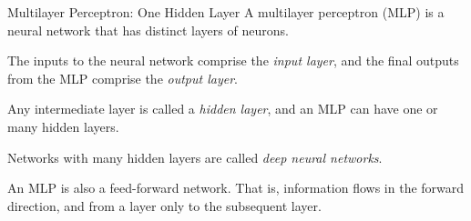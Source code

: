 \ifdefined\wox \begin{frame} \titlepage \end{frame} \fi

\begin{frame}{Multilayer Perceptron: One Hidden Layer}
A multilayer perceptron (MLP) is a neural network that has distinct layers of
neurons. 

\medskip 
The inputs to the neural network comprise the {\em input
layer}, and the final outputs from the MLP comprise the {\em output
layer}. 

	\medskip

	Any intermediate layer is called a {\em hidden layer}, and an MLP
can have one or many hidden layers. 

	\medskip

	Networks with many hidden layers are
called {\em deep neural networks}. 


\medskip 
An MLP is also a feed-forward network. That is, information flows
in the forward direction, and from a layer only to the subsequent layer. 
\end{frame}
%
